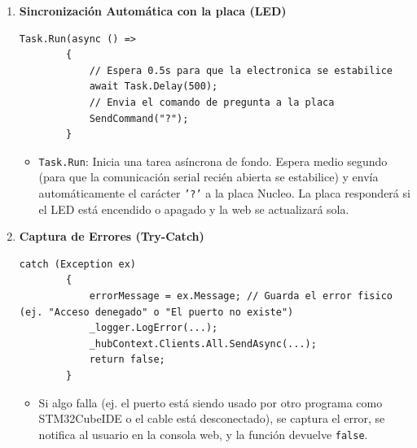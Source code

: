 \documentclass[
10pt, %
a4paper, %
oneside, %
headinclude,footinclude, %
BCOR5mm, %
]{scrartcl}
\begin{document}
\begin{enumerate}
\begin{lstlisting}[style=VSCodeDark]
		_hubContext.Clients.All.SendAsync("ReceiveTxLog", $"[Sistema] Puerto COM conectado con exito a {baudRate} bps.");\end{lstlisting}
	\begin{itemize}
		\item Envía notificaciones de manera instantánea a todos los navegadores conectados diciendo: \textit{"¡Ya estamos conectados!"} y añade un registro de log a la consola.
	\end{itemize}
	\item \textbf{Sincronización Automática con la placa (LED)}
		\begin{lstlisting}[style=VSCodeDark]
		Task.Run(async () =>
		{
			// Espera 0.5s para que la electronica se estabilice
			await Task.Delay(500);
			// Envia el comando de pregunta a la placa		 
			SendCommand("?");      
		}\end{lstlisting}
	\begin{itemize}
		\item \texttt{Task.Run}: Inicia una tarea asíncrona de fondo. Espera medio segundo (para que la comunicación serial recién abierta se estabilice) y envía automáticamente el carácter \texttt{'?'} a la placa Nucleo. La placa responderá si el LED está encendido o apagado y la web se actualizará sola.
	\end{itemize}
	\item \textbf{Captura de Errores (Try-Catch)}
	\begin{lstlisting}[style=VSCodeDark]
		catch (Exception ex)
		{
			errorMessage = ex.Message; // Guarda el error fisico (ej. "Acceso denegado" o "El puerto no existe")
			_logger.LogError(...);
			_hubContext.Clients.All.SendAsync(...);
			return false;
		}
	\end{lstlisting}
	\begin{itemize}
		\item Si algo falla (ej. el puerto está siendo usado por otro programa como STM32CubeIDE o el cable está desconectado), se captura el error, se notifica al usuario en la consola web, y la función devuelve \texttt{false}.
	\end{itemize}
\end{enumerate}
\end{document}
